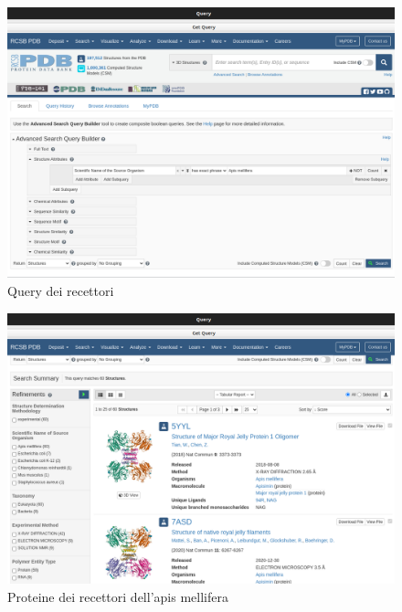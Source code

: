 \begin{figure}[H]
    \centering
    \includegraphics[scale=0.4]{immagini/queryRecettori.png}
    \caption{Query dei recettori}
    \label{fig:queryRecettori}
\end{figure}

\begin{figure}[H]
    \centering
    \includegraphics[scale=0.4]{immagini/fileRecettori.png}
    \caption{Proteine dei recettori dell'apis mellifera}
    \label{fig:fileRecettori}
\end{figure}

